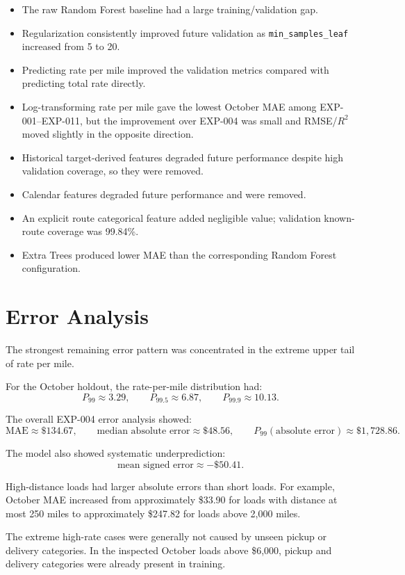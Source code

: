 \documentclass[11pt,a4paper]{article}
\newcommand{\mae}{\mathrm{MAE}}
\begin{document}
\begin{itemize}
    \item The raw Random Forest baseline had a large training/validation gap.
    \item Regularization consistently improved future validation as \texttt{min\_samples\_leaf} increased from 5 to 20.
    \item Predicting rate per mile improved the validation metrics compared with predicting total rate directly.
    \item Log-transforming rate per mile gave the lowest October MAE among EXP-001--EXP-011, but the improvement over EXP-004 was small and RMSE/\(R^2\) moved slightly in the opposite direction.
    \item Historical target-derived features degraded future performance despite high validation coverage, so they were removed.
    \item Calendar features degraded future performance and were removed.
    \item An explicit route categorical feature added negligible value; validation known-route coverage was 99.84\%.
    \item Extra Trees produced lower MAE than the corresponding Random Forest configuration.
\end{itemize}

\section{Error Analysis}

The strongest remaining error pattern was concentrated in the extreme upper tail of rate per mile.

For the October holdout, the rate-per-mile distribution had:
\[
P_{99} \approx 3.29,
\qquad
P_{99.5} \approx 6.87,
\qquad
P_{99.9} \approx 10.13.
\]

The overall EXP-004 error analysis showed:
\[
\mae \approx \$134.67,
\qquad
\text{median absolute error} \approx \$48.56,
\qquad
P_{99}(\text{absolute error}) \approx \$1,728.86.
\]

The model also showed systematic underprediction:
\[
\text{mean signed error} \approx -\$50.41.
\]

High-distance loads had larger absolute errors than short loads. For example, October MAE increased from approximately \$33.90 for loads with distance at most 250 miles to approximately \$247.82 for loads above 2,000 miles.

The extreme high-rate cases were generally not caused by unseen pickup or delivery categories. In the inspected October loads above \$6,000, pickup and delivery categories were already present in training.
\end{document}
